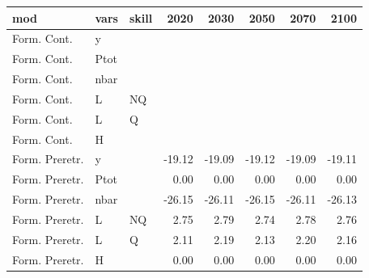 \begin{tabular}{lllrrrrr}
  \hline
mod & vars & skill & 2020 & 2030 & 2050 & 2070 & 2100 \\ 
  \hline
Form. Cont. & y &  &  &  &  &  &  \\ 
  Form. Cont. & Ptot &  &  &  &  &  &  \\ 
  Form. Cont. & nbar &  &  &  &  &  &  \\ 
  Form. Cont. & L & NQ &  &  &  &  &  \\ 
  Form. Cont. & L & Q &  &  &  &  &  \\ 
  Form. Cont. & H &  &  &  &  &  &  \\ 
  Form. Preretr. & y &  & -19.12 & -19.09 & -19.12 & -19.09 & -19.11 \\ 
  Form. Preretr. & Ptot &  & 0.00 & 0.00 & 0.00 & 0.00 & 0.00 \\ 
  Form. Preretr. & nbar &  & -26.15 & -26.11 & -26.15 & -26.11 & -26.13 \\ 
  Form. Preretr. & L & NQ & 2.75 & 2.79 & 2.74 & 2.78 & 2.76 \\ 
  Form. Preretr. & L & Q & 2.11 & 2.19 & 2.13 & 2.20 & 2.16 \\ 
  Form. Preretr. & H &  & 0.00 & 0.00 & 0.00 & 0.00 & 0.00 \\ 
   \hline
\end{tabular}
